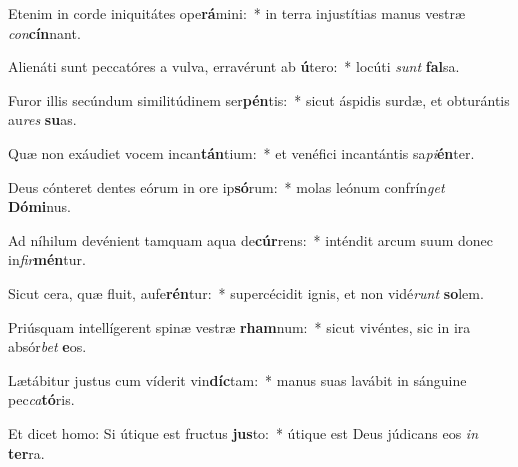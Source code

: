 \item Etenim in corde iniquitátes ope\textbf{rá}mini:~* in terra injustítias manus vestræ \textit{con}\textbf{cín}nant.
\item Alienáti sunt peccatóres a vulva, erravérunt ab \textbf{ú}tero:~* locúti \textit{sunt} \textbf{fal}sa.
\item Furor illis secúndum similitúdinem ser\textbf{pén}tis:~* sicut áspidis surdæ, et obturántis au\textit{res} \textbf{su}as.
\item Quæ non exáudiet vocem incan\textbf{tán}tium:~* et venéfici incantántis sa\textit{pi}\textbf{én}ter.
\item Deus cónteret dentes eórum in ore ip\textbf{só}rum:~* molas leónum confrín\textit{get} \textbf{Dó}\textbf{mi}nus.
\item Ad níhilum devénient tamquam aqua de\textbf{cúr}rens:~* inténdit arcum suum donec in\textit{fir}\textbf{mén}tur.
\item Sicut cera, quæ fluit, aufe\textbf{rén}tur:~* supercécidit ignis, et non vidé\textit{runt} \textbf{so}lem.
\item Priúsquam intellígerent spinæ vestræ \textbf{rham}num:~* sicut vivéntes, sic in ira absór\textit{bet} \textbf{e}os.
\item Lætábitur justus cum víderit vin\textbf{díc}tam:~* manus suas lavábit in sánguine pec\textit{ca}\textbf{tó}ris.
\item Et dicet homo: Si útique est fructus \textbf{jus}to:~* útique est Deus júdicans eos \textit{in} \textbf{ter}ra.
